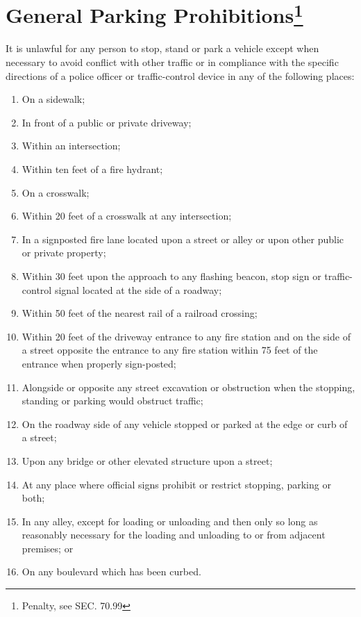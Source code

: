 \section{General Parking Prohibitions\footnote{Penalty, see SEC. 70.99}}
It is unlawful for any person to stop, stand or park a vehicle except when necessary to avoid conflict with other traffic or in compliance with the specific directions of a police officer or traffic-control device in any of the following places:
\begin{enumerate}[{\indent}A)]
\item On a sidewalk;
\item In front of a public or private driveway;
\item Within an intersection;
\item Within ten feet of a fire hydrant;
\item On a crosswalk;
\item Within 20 feet of a crosswalk at any intersection;
\item In a signposted fire lane located upon a street or alley or upon other public or private property;
\item Within 30 feet upon the approach to any flashing beacon, stop sign or traffic-control signal located at the side of a roadway;
\item Within 50 feet of the nearest rail of a railroad crossing;
\item Within 20 feet of the driveway entrance to any fire station and on the side of a street opposite the entrance to any fire station within 75 feet of the entrance when properly sign-posted;
\item Alongside or opposite any street excavation or obstruction when the stopping, standing or parking would obstruct traffic;
\item On the roadway side of any vehicle stopped or parked at the edge or curb of a street;
\item Upon any bridge or other elevated structure upon a street;
\item At any place where official signs prohibit or restrict stopping, parking or both;
\item In any alley, except for loading or unloading and then only so long as reasonably necessary for the loading and unloading to or from adjacent premises; or
\item On any boulevard which has been curbed.
\end{enumerate}

